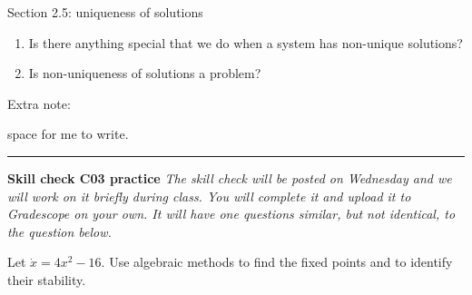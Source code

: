 \documentclass[12pt,letterpaper,noanswers]{exam}
\begin{document}
Section 2.5: uniqueness of solutions
\begin{enumerate}
\itemsep-0.2em
    \item Is there anything special that we do when a system has non-unique solutions?
    \item Is non-uniqueness of solutions a problem?
\end{enumerate}

Extra note: 

\eject
space for me to write.

\eject







\vfill

\vspace{0.2cm}

\hrule
\vspace{0.2cm}
\noindent\textbf{Skill check C03 practice} \emph{The skill check will be posted on Wednesday and we will work on it briefly during class.  You will complete it and upload it to Gradescope on your own.  It will have one questions similar, but not identical, to the question below.}

\begin{questions}



\question Let $\displaystyle\dot{x} = 4x^2 - 16$.  Use algebraic methods to find the fixed points and to identify their stability.  %
\vspace{1in}
\end{questions}
\end{document}
